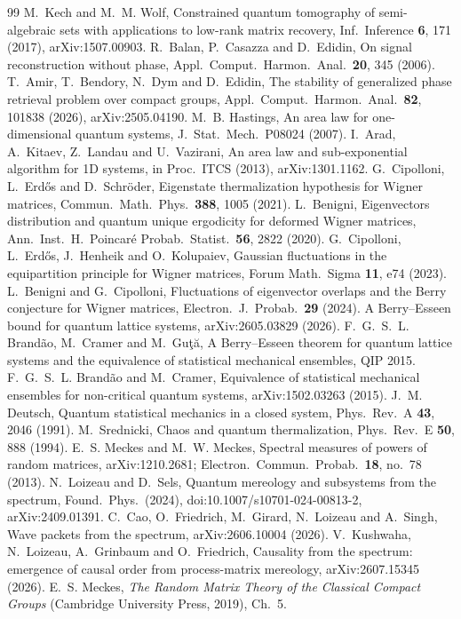 \documentclass[11pt]{article}
\theoremstyle{definition}
\theoremstyle{remark}
\begin{document}
\begin{thebibliography}{99}
 M.~Kech and M.~M. Wolf, Constrained quantum tomography of semi-algebraic sets with applications to low-rank matrix recovery, Inf.\ Inference \textbf{6}, 171 (2017), arXiv:1507.00903.
 R.~Balan, P.~Casazza and D.~Edidin, On signal reconstruction without phase, Appl.\ Comput.\ Harmon.\ Anal.\ \textbf{20}, 345 (2006).
 T.~Amir, T.~Bendory, N.~Dym and D.~Edidin, The stability of generalized phase retrieval problem over compact groups, Appl.\ Comput.\ Harmon.\ Anal.\ \textbf{82}, 101838 (2026), arXiv:2505.04190.
 M.~B. Hastings, An area law for one-dimensional quantum systems, J.\ Stat.\ Mech.\ P08024 (2007).
 I.~Arad, A.~Kitaev, Z.~Landau and U.~Vazirani, An area law and sub-exponential algorithm for 1D systems, in Proc.\ ITCS (2013), arXiv:1301.1162.
 G.~Cipolloni, L.~Erd\H{o}s and D.~Schr\"oder, Eigenstate thermalization hypothesis for Wigner matrices, Commun.\ Math.\ Phys.\ \textbf{388}, 1005 (2021).
 L.~Benigni, Eigenvectors distribution and quantum unique ergodicity for deformed Wigner matrices, Ann.\ Inst.\ H.\ Poincar\'e Probab.\ Statist.\ \textbf{56}, 2822 (2020).
 G.~Cipolloni, L.~Erd\H{o}s, J.~Henheik and O.~Kolupaiev, Gaussian fluctuations in the equipartition principle for Wigner matrices, Forum Math.\ Sigma \textbf{11}, e74 (2023).
 L.~Benigni and G.~Cipolloni, Fluctuations of eigenvector overlaps and the Berry conjecture for Wigner matrices, Electron.\ J.\ Probab.\ \textbf{29} (2024).
 A Berry--Esseen bound for quantum lattice systems, arXiv:2605.03829 (2026). %
 F.~G.~S.~L. Brand\~ao, M.~Cramer and M.~Gu\c{t}\u{a}, A Berry--Esseen theorem for quantum lattice systems and the equivalence of statistical mechanical ensembles, QIP 2015.
 F.~G.~S.~L. Brand\~ao and M.~Cramer, Equivalence of statistical mechanical ensembles for non-critical quantum systems, arXiv:1502.03263 (2015).
 J.~M. Deutsch, Quantum statistical mechanics in a closed system, Phys.\ Rev.\ A \textbf{43}, 2046 (1991).
 M.~Srednicki, Chaos and quantum thermalization, Phys.\ Rev.\ E \textbf{50}, 888 (1994).
 E.~S. Meckes and M.~W. Meckes, Spectral measures of powers of random matrices, arXiv:1210.2681; Electron.\ Commun.\ Probab.\ \textbf{18}, no.~78 (2013). %
 N.~Loizeau and D.~Sels, Quantum mereology and subsystems from the spectrum, Found.\ Phys.\ (2024), doi:10.1007/s10701-024-00813-2, arXiv:2409.01391.
 C.~Cao, O.~Friedrich, M.~Girard, N.~Loizeau and A.~Singh, Wave packets from the spectrum, arXiv:2606.10004 (2026).
 V.~Kushwaha, N.~Loizeau, A.~Grinbaum and O.~Friedrich, Causality from the spectrum: emergence of causal order from process-matrix mereology, arXiv:2607.15345 (2026).
 E.~S. Meckes, \emph{The Random Matrix Theory of the Classical Compact Groups} (Cambridge University Press, 2019), Ch.~5.
\end{thebibliography}
\end{document}
